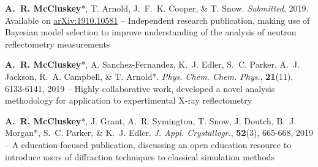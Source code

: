 \begin{cventriesy}
  \cventryy
    {
      \begin{cvitemsy}
        \item {\textbf{A.~R. McCluskey}*, T. Arnold, J.~F.~K. Cooper, \& T. Snow. \emph{Submitted}, 2019. Available on \href{https://arxiv.org/abs/1910.10581}{arXiv:1910.10581} -- Independent research publication, making use of Bayesian model selection to improve understanding of the analysis of neutron reflectometry measurements}
    \vspace{1mm}
        \item {\textbf{A.~R. McCluskey}*, A. Sanchez-Fernandez, K.~J. Edler, S.~C. Parker, A.~J. Jackson, R.~A. Campbell, \& T. Arnold*. \emph{Phys. Chem. Chem. Phys.}, \textbf{21}(11), 6133-6141, 2019 -- Highly collaborative work, developed a novel analysis methodology for application to expertimental X-ray reflectometry}
    \vspace{1mm}
        \item {\textbf{A.~R. McCluskey}*, J. Grant, A.~R. Symington, T. Snow, J. Doutch, B.~J. Morgan*, S.~C. Parker, \& K.~J. Edler. \emph{J. Appl. Crystallogr.}, \textbf{52}(3), 665-668, 2019 -- A education-focused publication, discussing an open education resource to introduce users of diffraction techniques to classical simulation methods} 
      \end{cvitemsy}
    }
\end{cventriesy}